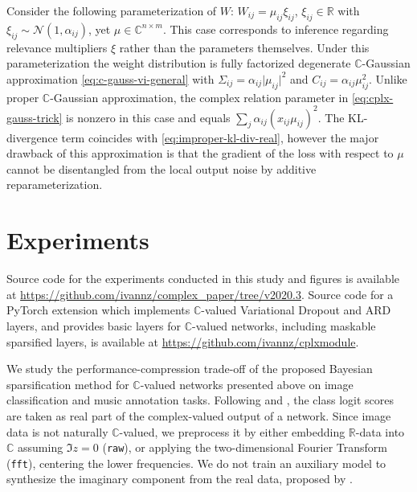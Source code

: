 \documentclass[a4paper,10pt,onecolumn]{article}
\newcommand{\real}{\mathbb{R}}
\newcommand{\cplx}{\mathbb{C}}
\begin{document}
Consider the following parameterization of $W$: $
  W_{ij} = \mu_{ij} \xi_{ij}
$, $\xi_{ij} \in \real$ with $
  \xi_{ij} \sim \mathcal{N}(1, \alpha_{ij})
$, yet $\mu \in \cplx^{n \times m}$. This case corresponds to inference regarding
relevance multipliers $\xi$ rather than the parameters themselves. Under this parameterization
the weight distribution is fully factorized degenerate $\cplx$-Gaussian approximation
\eqref{eq:c-gauss-vi-general} with $
  \Sigma_{ij} = \alpha_{ij} \lvert \mu_{ij} \rvert^2
$ and $
  C_{ij} = \alpha_{ij} \mu_{ij}^2
$. Unlike proper $\cplx$-Gaussian approximation, the complex relation parameter in
\eqref{eq:cplx-gauss-trick} is nonzero in this case and equals $
  \sum_j \alpha_{ij} (x_{ij} \mu_{ij})^2
$.
%
The KL-divergence term coincides with \eqref{eq:improper-kl-div-real}, however the major
drawback of this approximation is that the gradient of the loss with respect to $\mu$ cannot
be disentangled from the local output noise by additive reparameterization.





\section{Experiments} %
\label{sec:experiments}

Source code for the experiments conducted in this study and figures is available at
\url{https://github.com/ivannz/complex_paper/tree/v2020.3}.
%
Source code for a PyTorch extension which implements $\cplx$-valued Variational Dropout and
ARD layers, and provides basic layers for $\cplx$-valued networks, including maskable
sparsified layers, is available at
\url{https://github.com/ivannz/cplxmodule}.
\smallskip

We study the performance-compression trade-off of the proposed Bayesian sparsification
method for $\cplx$-valued networks presented above on image classification and music
annotation tasks.
%
Following \citet{wolter_complex_2018} and \citet{trabelsi_deep_2017}, the class logit scores
are taken as real part of the complex-valued output of a network.
%
Since image data is not naturally $\cplx$-valued, we preprocess it by either embedding
$\real$-data into $\cplx$ assuming $\Im z = 0$ (\texttt{raw}), or applying the two-dimensional
Fourier Transform (\texttt{fft}), centering the lower frequencies. We do not train an
auxiliary model to synthesize the imaginary component from the real data, proposed by
\citet{trabelsi_deep_2017}.
\end{document}
